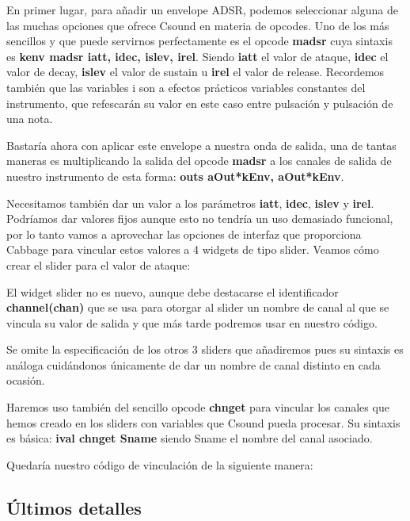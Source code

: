 En primer lugar, para añadir un envelope ADSR, podemos seleccionar alguna de las muchas opciones que ofrece Csound en materia de opcodes. Uno de los más sencillos y que puede servirnos perfectamente es el opcode \textbf{madsr} cuya sintaxis es \textbf{kenv madsr iatt, idec, islev, irel}. Siendo \textbf{iatt} el valor de ataque, \textbf{idec} el valor de decay, \textbf{islev} el valor de sustain u \textbf{irel} el valor de release. Recordemos también que las variables i son a efectos prácticos variables constantes del instrumento, que refescarán su valor en este caso entre pulsación y pulsación de una nota.

Bastaría ahora con aplicar este envelope a nuestra onda de salida, una de tantas maneras es multiplicando la salida del opcode \textbf{madsr} a los canales de salida de nuestro instrumento de esta forma: \textbf{outs aOut*kEnv, aOut*kEnv}.

Necesitamos también dar un valor a los parámetros \textbf{iatt}, \textbf{idec}, \textbf{islev} y \textbf{irel}. Podríamos dar valores fijos aunque esto no tendría un uso demasiado funcional, por lo tanto vamos a aprovechar las opciones de interfaz que proporciona Cabbage para vincular estos valores a 4 widgets de tipo slider.
Veamos cómo crear el slider para el valor de ataque:


El widget slider no es nuevo, aunque debe destacarse el identificador \textbf{channel(chan)} que se usa para otorgar al slider un nombre de canal al que se vincula su valor de salida y que más tarde podremos usar en nuestro código.

Se omite la especificación de los otros 3 sliders que añadiremos pues su sintaxis es análoga cuidándonos únicamente de dar un nombre de canal distinto en cada ocasión.

Haremos uso también del sencillo opcode \textbf{chnget} para vincular los canales que hemos creado en los sliders con variables que Csound pueda procesar. Su sintaxis es básica: \textbf{ival chnget Sname} siendo Sname el nombre del canal asociado.

Quedaría nuestro código de vinculación de la siguiente manera:


\subsection{Últimos detalles}\label{sec:detalles}

